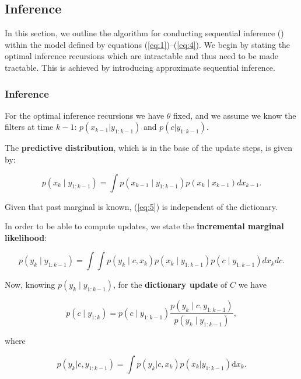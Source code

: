 \documentclass{mldsmsc}
\begin{document}
\subsection{Inference}

In this section, we outline the algorithm for conducting sequential inference (\cite{akyildiz2021probabilistic}) within the model defined by equations (\ref{eq:1})–(\ref{eq:4}). We begin by stating the optimal inference recursions which are intractable and thus need to be made tractable. This is achieved by introducing approximate sequential inference.

\subsubsection{Inference}

For the optimal inference recursions we have $\theta$ fixed, and we assume we know the filters at time $k - 1$: $p(x_{k-1}|y_{1:k-1})$ and $p(c|y_{1:k-1})$. \newline

\noindent The \textbf{predictive distribution}, which is in the base of the update steps, is given by:

\begin{equation} \label{eq:5}
    p(x_k \mid y_{1:k-1}) = \int p(x_{k-1} \mid y_{1:k-1}) p(x_k \mid x_{k-1}) dx_{k-1}.
\end{equation}

\noindent Given that past marginal is known, (\ref{eq:5}) is independent of the dictionary. \newline

\noindent In order to be able to compute updates, we state the \textbf{incremental marginal likelihood}:

\begin{equation}
    p(y_k \mid y_{1:k-1}) = \int \int p(y_k \mid c, x_k) p(x_k \mid y_{1:k-1}) p(c \mid y_{1:k-1}) dx_k dc.
\end{equation}

\noindent Now, knowing $p(y_k \mid y_{1:k-1})$, for the \textbf{dictionary update} of $C$ we have

\begin{equation}
    p(c \mid y_{1:k}) = p(c \mid y_{1:k-1}) \frac{p(y_k \mid c, y_{1:k-1})}{p(y_k \mid y_{1:k-1})},
\end{equation}

\noindent where

\begin{equation}
    p(y_k | c, y_{1:k-1}) = \int p(y_k | c, x_k) p(x_k | y_{1:k-1}) \text{d}x_k.
\end{equation}
  
\end{document}
